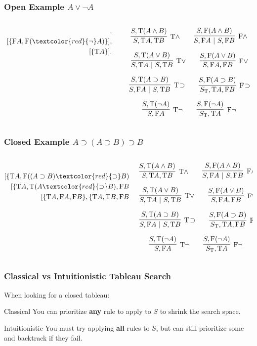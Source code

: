 \documentclass[mathserif]{beamer}
\def\|{~|~}
\def\T{\textrm{T}}
\def\F{\textrm{F}}
\def\imp{\supset}
\newcommand{\diff}[1]{\textcolor{red}{#1}}
\def\mycalc{
$$
\infer
  [\T \land]
  {S , \T A , \T B}
{
  {S , \T(A \land B)}
}
\qquad
\infer
  [\F \land]
  {S, \F A \| S, \F B}
{
  {S, \F(A \land B)}
}
$$

$$
\infer
  [\T \lor]
  {S , \T A \| S , \T B}
{
  {S , \T(A \lor B)}
}
\qquad
\infer
  [\F \lor]
  {S, \F A , \F B}
{
  {S, \F(A \lor B)}
}
$$

$$
\infer
  [\T \! \imp]
  {S , \F A \| S , \T B}
{
  {S , \T(A \imp B)}
}
\qquad
\infer
  [\F \! \imp]
  {S_{\T}, \T A , \F B}
{
  {S, \F(A \imp B)}
}
$$

$$
\infer
  [\T \neg]
  {S , \F A}
{
  {S , \T(\neg A)}
}
\qquad
\infer
  [\F \neg]
  {S_{\T}, \T A}
{
  {S, \F(\neg A)}
}
$$
}
\begin{document}
\begin{frame}
\frametitle{Open Example $A \lor \neg A$}

\begin{columns}[T]
\begin{column}[T]{4cm}
\begin{align*}
[\{ \F(A \diff{\lor} \neg A) \}],\\
[\{ \F A, \F(\diff{\neg} A) \}],\\
[\{ \T A \}].
\end{align*}
\end{column}

\begin{column}[T]{7cm}
\mycalc
\end{column}
\end{columns}

\end{frame}

\begin{frame}
\frametitle{Closed Example $A \imp (A \imp B) \imp B$}

\begin{columns}[T]
\begin{column}[T]{4cm}
\begin{align*}
[\{ \F(A \diff{\imp} (A \imp B) \imp B) \}],\\
[\{ \T A , \F((A \imp B) \diff{\imp} B) \}],\\
[\{ \T A, \T(A \diff{\imp} B) , \F B \}],\\
[\{ \T A, \F A, \F B \}, \{ \T A, \T B , \F B \}].
\end{align*}
\end{column}

\begin{column}[T]{7cm}
\mycalc
\end{column}
\end{columns}

\end{frame}


\begin{frame}
\frametitle{Classical vs Intuitionistic Tableau Search}

When looking for a closed tableau:

\begin{block}{Classical}
You can prioritize {\bf any} rule to apply to $S$ to shrink the search space.
\end{block}

\begin{block}{Intuitionistic}
You must try applying {\bf all} rules to $S$,
but can still prioritize some and backtrack if they fail.
\end{block}

\end{frame}
\end{document}
